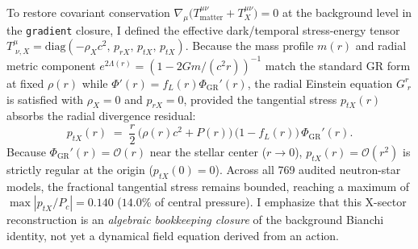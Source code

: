 \par
To restore covariant conservation $\nabla_\mu\bigl(T^{\mu\nu}_{\text{matter}} + T^{\mu\nu}_X\bigr) = 0$ at the background level in the \texttt{gradient} closure, I defined the effective dark/temporal stress-energy tensor $T^\mu_{\;\nu,X} = \text{diag}(-\rho_X c^2,\, p_{rX},\, p_{tX},\, p_{tX})$. Because the mass profile $m(r)$ and radial metric component $e^{2\Lambda(r)} = (1 - 2Gm/(c^2 r))^{-1}$ match the standard GR form at fixed $\rho(r)$ while $\Phi'(r) = f_L(r)\Phi_{\text{GR}}'(r)$, the radial Einstein equation $G^r_{\;r}$ is satisfied with $\rho_X = 0$ and $p_{rX} = 0$, provided the tangential stress $p_{tX}(r)$ absorbs the radial divergence residual:
\begin{equation}
  p_{tX}(r) \;=\; \frac{r}{2}\,\bigl(\rho(r)c^2 + P(r)\bigr)\,\bigl(1 - f_L(r)\bigr)\,\Phi_{\text{GR}}'(r).
\end{equation}
Because $\Phi_{\text{GR}}'(r) = \mathcal{O}(r)$ near the stellar center ($r \to 0$), $p_{tX}(r) = \mathcal{O}(r^2)$ is strictly regular at the origin ($p_{tX}(0) = 0$). Across all 769 audited neutron-star models, the fractional tangential stress remains bounded, reaching a maximum of \textbf{$\max |p_{tX}/P_c| = 0.140$} ($14.0\%$ of central pressure). I emphasize that this X-sector reconstruction is an \emph{algebraic bookkeeping closure} of the background Bianchi identity, not yet a dynamical field equation derived from an action.

